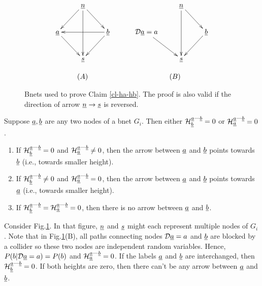 \documentclass[12pt]{article}
\newcommand{\linkab }[0]{{\rva\text{---}\rvb}}
\begin{document}
\begin{figure}[h!]
$$
\begin{array}{ccc}
\xymatrix{
&\rvn\ar[ld]\ar[rd]\ar[dd]
\\
\rva\ar[rd]
&&\rvb\ar[ll]
\ar[ld]
\\
&
\rvs
}
&\quad&
\xymatrix{
&\rvn\ar[rd]\ar[dd]
\\
\cald\rva = a\ar[rd]
&&\rvb
\ar[ld]
\\
&
\rvs
}
\\
\\
(A)&&\quad(B)
\end{array}
$$
\caption{Bnets used 
to prove Claim \ref{cl-ha-hb}.
The proof is also valid if the
direction of
arrow ${\underline{n}}\rightarrow{\underline{s}}$
is reversed. }
\label{fig-ha-hb}
\end{figure} 


\begin{claim}\label{cl-ha-hb}
Suppose ${\underline{a}}, {\underline{b}}$ 
are any two nodes of
a bnet $G_i$. Then
either 
$\calh_\rvb^\linkab=0$ or  $\calh_\rva^\linkab=0$.
\begin{enumerate}
\item 
If $\calh_\rvb^\linkab=0$ and  $\calh_\rva^\linkab\neq 0$, then
the arrow between ${\underline{a}}$
and ${\underline{b}}$ points towards ${\underline{b}}$
(i.e., towards smaller height).
\item
If $\calh_\rvb^\linkab\neq 0$ and  $\calh_\rva^\linkab= 0$, then
the arrow between ${\underline{a}}$
and ${\underline{b}}$ points towards ${\underline{a}}$
(i.e., towards smaller height).

\item
If
$\calh_\rvb^\linkab= \calh_\rva^\linkab=0$,
then 
there is no arrow between
${\underline{a}}$ and ${\underline{b}}$.


\end{enumerate}
\end{claim}
\proof

Consider Fig.\ref{fig-ha-hb}.
In that figure, ${\underline{n}}$ and ${\underline{s}}$
might each represent multiple nodes
of $G_i$.
Note that in 
Fig.\ref{fig-ha-hb}(B),
all paths connecting nodes ${\cal D} {\underline{a}}=a$ and 
${\underline{b}}$ are blocked by a collider
so these two nodes are independent
random variables.
Hence, $P(b|{\cal D} {\underline{a}}=a)= P(b)$
and $\calh_\rva^\linkab=0$.
If the labels ${\underline{a}}$ and ${\underline{b}}$ are 
interchanged, then 
$\calh_\rvb^\linkab=0$.
If both heights 
are zero, then there can't be any arrow
between ${\underline{a}}$ and ${\underline{b}}$.
\end{document}

